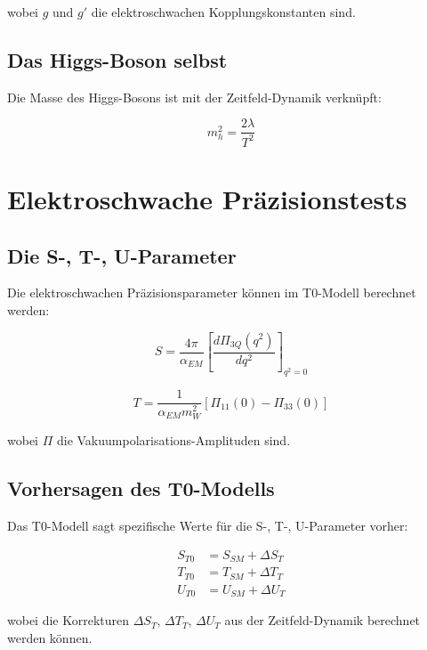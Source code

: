 \documentclass[12pt,a4paper]{report}
\begin{document}
	wobei $g$ und $g'$ die elektroschwachen Kopplungskonstanten sind.
	
	\subsection{Das Higgs-Boson selbst}
	
	Die Masse des Higgs-Bosons ist mit der Zeitfeld-Dynamik verknüpft:
	
	\begin{equation}
		m_h^2 = \frac{2\lambda}{T^2}
	\end{equation}
	
	\section{Elektroschwache Präzisionstests}
	
	\subsection{Die S-, T-, U-Parameter}
	
	Die elektroschwachen Präzisionsparameter können im T0-Modell berechnet werden:
	
	\begin{equation}
		S = \frac{4\pi}{\alpha_{EM}}\left[\frac{d\Pi_{3Q}(q^2)}{dq^2}\right]_{q^2=0}
	\end{equation}
	
	\begin{equation}
		T = \frac{1}{\alpha_{EM}m_W^2}[\Pi_{11}(0) - \Pi_{33}(0)]
	\end{equation}
	
	wobei $\Pi$ die Vakuumpolarisations-Amplituden sind.
	
	\subsection{Vorhersagen des T0-Modells}
	
	Das T0-Modell sagt spezifische Werte für die S-, T-, U-Parameter vorher:
	
	\begin{align}
		S_{T0} &= S_{SM} + \Delta S_T \\
		T_{T0} &= T_{SM} + \Delta T_T \\
		U_{T0} &= U_{SM} + \Delta U_T
	\end{align}
	
	wobei die Korrekturen $\Delta S_T$, $\Delta T_T$, $\Delta U_T$ aus der Zeitfeld-Dynamik berechnet werden können.
	
\end{document}
